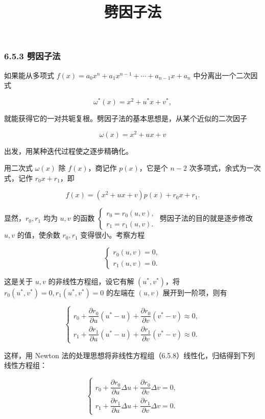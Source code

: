\documentclass[
  10pt,
  fontset=fandol]{ctexart}
\title{劈因子法}
\author{}
\date{}
\begin{document}
\maketitle

\subsubsection{6.5.3 劈因子法}\label{ux5288ux56e0ux5b50ux6cd5}

如果能从多项式 \(f(x)=a_0x^n+a_1x^{n-1}+\cdots+a_{n-1}x+a_n\) 中分离出一个二次因式

\[
\omega^*(x)=x^2+u^*x+v^*,
\]

就能获得它的一对共轭复根。劈因子法的基本思想是，从某个近似的二次因子

\[
\omega(x)=x^2+ux+v
\]

出发，用某种迭代过程使之逐步精确化。

用二次式 \(\omega(x)\) 除 \(f(x)\)，商记作 \(p(x)\)，它是个 \(n-2\) 次多项式，余式为一次式，记作 \(r_0x+r_1\)，即

\[
f(x)=(x^2+ux+v)p(x)+r_0x+r_1.
\tag{6.5.7}
\]

显然，\(r_0,r_1\) 均为 \(u,v\) 的函数 \(\begin{cases}r_0=r_0(u,v),\\r_1=r_1(u,v).\end{cases}\) 劈因子法的目的就是逐步修改 \(u,v\) 的值，使余数 \(r_0,r_1\) 变得很小。考察方程

\[
\begin{cases}
r_0(u,v)=0,\\
r_1(u,v)=0.
\end{cases}
\tag{6.5.8}
\]

这是关于 \(u,v\) 的非线性方程组，设它有解 \((u^*,v^*)\)，将 \(r_0(u^*,v^*)=0,r_1(u^*,v^*)=0\) 的左端在 \((u,v)\) 展开到一阶项，则有

\[
\begin{cases}
r_0+\dfrac{\partial r_0}{\partial u}(u^*-u)+\dfrac{\partial r_0}{\partial v}(v^*-v)\approx0,\\
r_1+\dfrac{\partial r_1}{\partial u}(u^*-u)+\dfrac{\partial r_1}{\partial v}(v^*-v)\approx0.
\end{cases}
\]

这样，用 Newton 法的处理思想将非线性方程组（6.5.8）线性化，归结得到下列线性方程组：

\[
\begin{cases}
r_0+\dfrac{\partial r_0}{\partial u}\Delta u+\dfrac{\partial r_0}{\partial v}\Delta v=0,\\
r_1+\dfrac{\partial r_1}{\partial u}\Delta u+\dfrac{\partial r_1}{\partial v}\Delta v=0.
\end{cases}
\tag{6.5.9}
\]
\end{document}
